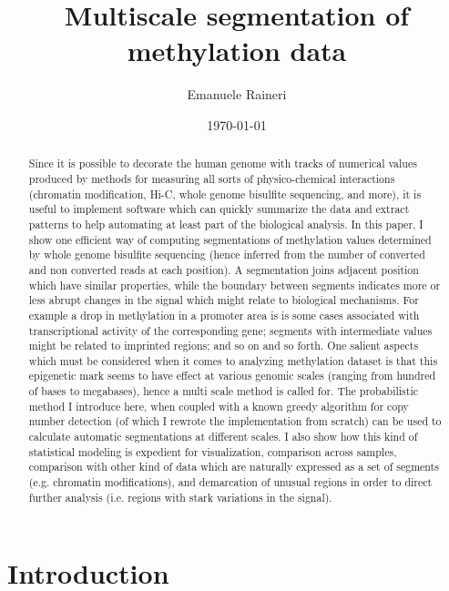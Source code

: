 \documentclass[11pt]{amsart}
\begin{document}
\title{Multiscale segmentation of methylation data}
\author{Emanuele Raineri}
\date{\today}
\maketitle

\begin{abstract}
Since it is possible to decorate the human genome with tracks of numerical
values produced by methods for measuring all sorts of physico-chemical interactions 
(chromatin modification,
Hi-C, whole genome bisulfite sequencing, and more), 
it is useful to implement software 
which can quickly summarize the data and extract patterns to help 
automating at least  part of the biological analysis. 
In this paper, I show one efficient way of computing 
segmentations of methylation values determined by 
whole genome bisulfite sequencing
(hence inferred from the number of converted and non converted reads 
at each position).  
A segmentation joins adjacent position
which have similar properties, while the boundary between segments 
indicates more or less abrupt changes
in the signal which might relate to biological mechanisms. 
For example
a drop in methylation in a promoter area is is some cases associated with 
transcriptional activity of the corresponding gene; 
segments with intermediate values might be related to imprinted regions; 
and so on and so forth.
One salient aspects which must be considered when it comes to 
analyzing methylation dataset is that this epigenetic mark seems 
to have effect at various genomic scales 
(ranging from hundred of bases to megabases), hence a multi scale method 
is called for. 
The probabilistic method I introduce here, when coupled with a known greedy 
algorithm for copy number detection 
(of which I rewrote the implementation from scratch) 
can be used to calculate automatic segmentations at different scales.
I also show how this 
kind of statistical modeling is expedient for 
visualization, comparison across samples,
comparison with other kind of data which are naturally expressed as a set of 
segments (e.g. chromatin modifications),  and demarcation of unusual regions in 
order to direct further analysis (i.e. regions with stark variations in the signal).
\end{abstract}

\section{Introduction}
\end{document}
